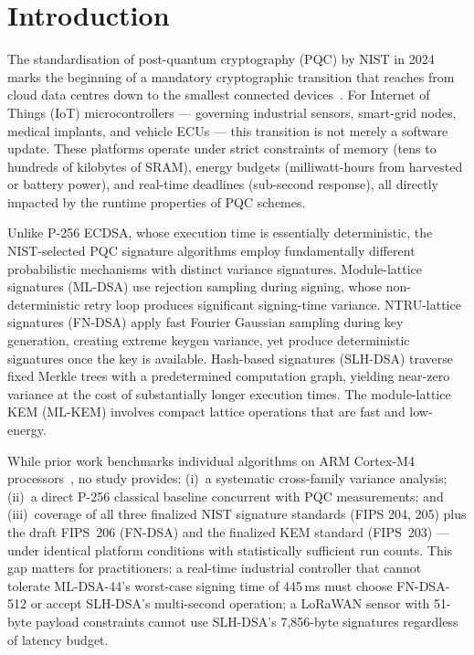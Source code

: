 \documentclass[iicol]{sn-jnl}
\begin{document}
\section{Introduction}
\label{sec:intro}

The standardisation of post-quantum cryptography (PQC) by NIST in 2024
marks the beginning of a mandatory cryptographic transition that reaches
from cloud data centres down to the smallest connected devices~\cite{nist-fips204,nist-fips205,nist-fips203}.
For Internet of Things (IoT) microcontrollers --- governing industrial
sensors, smart-grid nodes, medical implants, and vehicle ECUs --- this
transition is not merely a software update.
These platforms operate under strict constraints of memory (tens to hundreds
of kilobytes of SRAM), energy budgets (milliwatt-hours from harvested or
battery power), and real-time deadlines (sub-second response), all
directly impacted by the runtime properties of PQC schemes.

Unlike P-256 ECDSA, whose execution time is essentially deterministic, the
NIST-selected PQC signature algorithms employ fundamentally different
probabilistic mechanisms with distinct variance signatures.
Module-lattice signatures (ML-DSA) use rejection sampling during signing,
whose non-deterministic retry loop produces significant signing-time
variance.
NTRU-lattice signatures (FN-DSA) apply fast Fourier Gaussian sampling
during key generation, creating extreme keygen variance, yet produce
deterministic signatures once the key is available.
Hash-based signatures (SLH-DSA) traverse fixed Merkle trees with a
predetermined computation graph, yielding near-zero variance at the cost
of substantially longer execution times.
The module-lattice KEM (ML-KEM) involves compact lattice operations that
are fast and low-energy.

While prior work benchmarks individual algorithms on ARM Cortex-M4
processors~\cite{pqm4,nejatollahi2019}, no study provides: (i)~a systematic cross-family variance
analysis; (ii)~a direct P-256 classical baseline concurrent with PQC
measurements; and (iii)~coverage of all three finalized NIST signature
standards (FIPS 204, 205) plus the draft FIPS~206 (FN-DSA) and the
finalized KEM standard (FIPS~203) --- under identical
platform conditions with statistically sufficient run counts.
This gap matters for practitioners: a real-time industrial controller
that cannot tolerate ML-DSA-44's worst-case signing time of 445\,ms must
choose FN-DSA-512 or accept SLH-DSA's multi-second operation; a
LoRaWAN sensor with 51-byte payload constraints cannot use SLH-DSA's
7,856-byte signatures regardless of latency budget.
\end{document}
